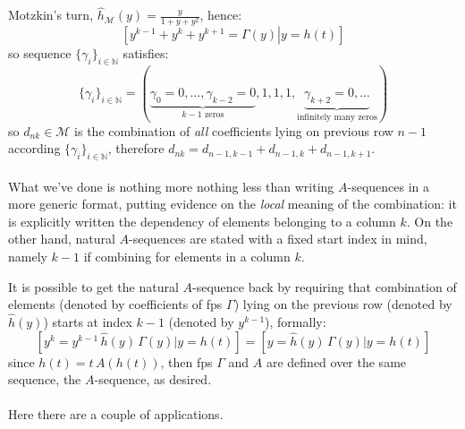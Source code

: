 Motzkin's turn, 
$\hat{h}_{\mathcal{M}}(y) = \frac{y}{1+y+y^2}$, hence:
\begin{displaymath}
        \left.\left[y^{k-1}+y^{k}+y^{k+1}=\Gamma(y)\right| y = h(t) \right]
\end{displaymath}
so sequence $\lbrace \gamma_{i} \rbrace_{i\in\mathbb{N}}$ satisfies:
\begin{displaymath}
    \lbrace \gamma_{i} \rbrace_{i\in\mathbb{N}} = 
        \left(\underbrace{\gamma_{0}=0,\ldots,\gamma_{k-2}=0}_{k-1 \text{ zeros}},
            1,1,1,
            \underbrace{\gamma_{k+2}=0, \ldots}_{\text{infinitely many zeros}} \right)
\end{displaymath}
so $d_{nk}\in\mathcal{M}$ is the combination of \emph{all} coefficients
lying on previous row $n-1$ according $\lbrace \gamma_{i} \rbrace_{i\in\mathbb{N}}$,
therefore $d_{nk}=d_{n-1,k-1}+d_{n-1,k}+d_{n-1,k+1}$.
\\\\
What we've done is nothing more nothing less than writing $A$-sequences 
in a more generic format, putting evidence on the \emph{local} meaning 
of the combination: it is explicitly written the dependency of 
elements belonging to a column $k$. On the other hand, natural $A$-sequences 
are stated with a fixed start index in mind, namely $k-1$ if combining 
for elements in a column $k$.

It is possible to get the natural $A$-sequence back by requiring that 
combination of elements (denoted by coefficients of \ac{fps} $\Gamma$)  
lying on the previous row (denoted by $\hat{h}(y)$)
starts at index $k-1$ (denoted by $y^{k-1}$), formally:
\begin{displaymath}
    \left[y^{k} = y^{k-1}\,\hat{h}(y)\,\Gamma(y) \big| y = h(t) \right] = 
    \left[y = \hat{h}(y)\,\Gamma(y) \big| y = h(t) \right]
\end{displaymath}
since $h(t) = t\,A(h(t))$, then \ac{fps}
$\Gamma$ and $A$ are defined over the same sequence, the $A$-sequence, as desired.
\\\\
Here there are a couple of applications. 

